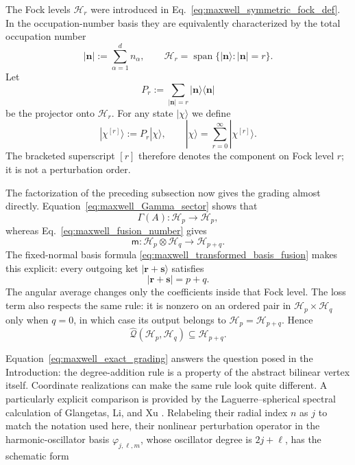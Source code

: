 \documentclass[11pt,oneside]{article}
\numberwithin{equation}{section}
\theoremstyle{definition}
\begin{document}
The Fock levels $\mathscr H_r$ were introduced in Eq.~\eqref{eq:maxwell_symmetric_fock_def}.  In the occupation-number basis they are equivalently characterized by the total occupation number
\begin{equation}
 |\bm n|:=\sum_{\alpha=1}^{d}n_\alpha,
\qquad
\mathscr H_r
=
\operatorname{span}\{|\bm n\rangle:|\bm n|=r\}.
\label{eq:maxwell_total_fock_grading}
\end{equation}
Let
\begin{equation}
 P_r
 :=
 \sum_{|\bm n|=r}|\bm n\rangle\langle\bm n|
\label{eq:maxwell_sector_projector}
\end{equation}
be the projector onto $\mathscr H_r$.  For any state $|\chi\rangle$ we define
\begin{equation}
|\chi^{[r]}\rangle:=P_r|\chi\rangle,
\qquad
|\chi\rangle=\sum_{r=0}^{\infty}|\chi^{[r]}\rangle .
\label{eq:maxwell_state_grading_def}
\end{equation}
The bracketed superscript $[r]$ therefore denotes the component on Fock level $r$; it is not a perturbation order.

The factorization of the preceding subsection now gives the grading almost directly.  Equation~\eqref{eq:maxwell_Gamma_sector} shows that
\begin{equation}
 \Gamma(A):\mathscr H_p\longrightarrow\mathscr H_p,
\end{equation}
whereas Eq.~\eqref{eq:maxwell_fusion_number} gives
\begin{equation}
 \mathsf m:\mathscr H_p\otimes\mathscr H_q
 \longrightarrow\mathscr H_{p+q}.
\end{equation}
The fixed-normal basis formula \eqref{eq:maxwell_transformed_basis_fusion} makes this explicit: every outgoing ket $|\bm r+\bm s\rangle$ satisfies
\begin{equation}
 |\bm r+\bm s|=p+q.
\end{equation}
The angular average changes only the coefficients inside that Fock level.  The loss term also respects the same rule: it is nonzero on an ordered pair in $\mathscr H_p\times\mathscr H_q$ only when $q=0$, in which case its output belongs to $\mathscr H_p=\mathscr H_{p+q}$.  Hence
\begin{equation}
\boxed{
\widehat{\mathcal Q}(\mathscr H_p,\mathscr H_q)
\subseteq
\mathscr H_{p+q}.
}
\label{eq:maxwell_exact_grading}
\end{equation}

Equation~\eqref{eq:maxwell_exact_grading} answers the question posed in the
Introduction: the degree-addition rule is a property of the abstract
bilinear vertex itself.  Coordinate realizations can make the same rule
look quite different.  A particularly explicit comparison is provided by
the Laguerre--spherical spectral calculation of
Glangetas, Li, and Xu \cite{GlangetasLiXu2016Triangular}.  Relabeling
their radial index $n$ as $j$ to match the notation used here, their
nonlinear perturbation operator in the harmonic-oscillator basis
$\varphi_{j,\ell,m}$, whose oscillator degree is $2j+\ell$, has the
schematic form
\end{document}
